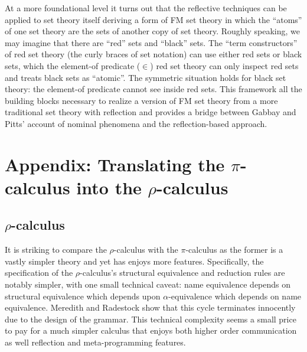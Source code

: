 \documentclass[submission,copyright,creativecommons]{eptcs}
\newcommand{\pic}{$\pi$-calculus}
\newcommand{\pzero}{\mathbin{0}}
\newcommand{\bc}{\mathbin{\mathbf{::=}}}
\newcommand{\bm}{\mathbin{\mathbf\mid}}
\newcommand{\rhoc}{$\rho$-calculus}
\theoremstyle{definition}
\theoremstyle{remark}
\theoremstyle{remark}
\begin{document}
At a more foundational level it turns out that the reflective
techniques can be applied to set theory itself deriving a form of FM
set theory in which the ``atoms'' of one set theory are the sets of
another copy of set theory. Roughly speaking, we may imagine that
there are ``red'' sets and ``black'' sets. The ``term constructors''
of red set theory (the curly braces of set notation) can use either
red sets or black sets, which the element-of predicate ($\in$) red set
theory can only inspect red sets and treats black sets as
``atomic''. The symmetric situation holds for black set theory: the
element-of predicate cannot see inside red sets. This framework all
the building blocks necessary to realize a version of FM set theory
from a more traditional set theory with reflection and provides a
bridge between Gabbay and Pitts' account of nominal phenomena and the
reflection-based approach.




\section{Appendix: Translating the {\pic} into the {\rhoc}}
\subsection{\rhoc}

It is striking to compare the {\rhoc} with the {\pic} as the former is
a vastly simpler theory and yet has enjoys more
features. Specifically, the specification of the {\rhoc}'s structural
equivalence and reduction rules are notably simpler, with one small
technical caveat: name equivalence depends on structural equivalence
which depends upon $\alpha$-equivalence which depends on name
equivalence. Meredith and Radestock show that this cycle terminates
innocently due to the design of the grammar. This technical complexity
seems a small price to pay for a much simpler calculus that enjoys
both higher order communication as well reflection and meta-programming
features.

\end{document}
